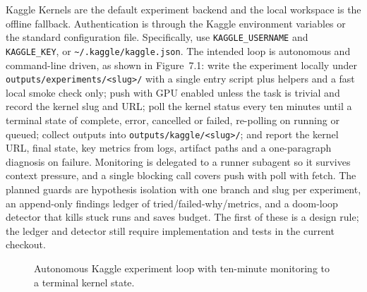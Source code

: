 \documentclass[12pt,a4paper]{report}
\numberwithin{equation}{chapter}
\begin{document}
Kaggle Kernels are the default experiment backend and the local workspace is
the offline fallback. Authentication is through the Kaggle environment
variables or the standard configuration file. Specifically, use
\texttt{KAGGLE\_USERNAME} and \texttt{KAGGLE\_KEY}, or
\texttt{\textasciitilde/.kaggle/kaggle.json}. The intended loop is autonomous
and command-line driven, as shown in Figure~7.1:
write the
experiment locally under \texttt{outputs/experiments/\textless slug\textgreater/}
with a single entry script plus helpers and a fast local smoke check only;
push with GPU enabled unless the task is trivial and record the kernel slug
and URL; poll the kernel status every ten minutes until a terminal state of
complete, error, cancelled or failed, re-polling on running or queued;
collect outputs into \texttt{outputs/kaggle/\textless slug\textgreater/};
and report the kernel URL, final state, key metrics from logs, artifact
paths and a one-paragraph diagnosis on failure. Monitoring is delegated to a
runner subagent so it survives context pressure, and a single blocking call
covers push with poll with fetch. The planned guards are hypothesis isolation
with one branch and slug per experiment, an append-only findings ledger of
tried/failed-why/metrics, and a doom-loop detector that kills stuck runs and
saves budget. The first of these is a design rule; the ledger and detector
still require implementation and tests in the current checkout.

\begin{figure}[ht]
\centering
{}
\caption{Autonomous Kaggle experiment loop with ten-minute monitoring to a
terminal kernel state.}
\end{figure}
\end{document}
